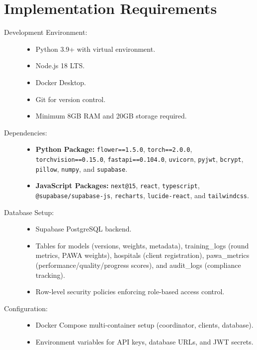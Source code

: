 \section{Implementation Requirements}

\begin{description}
    \item[Development Environment:] \hfill
    \begin{itemize}
        \item Python 3.9+ with virtual environment.
        \item Node.js 18 LTS.
        \item Docker Desktop.
        \item Git for version control.
        \item Minimum 8GB RAM and 20GB storage required.
    \end{itemize}
    \item[Dependencies:] \hfill
    \begin{itemize}
        \item \textbf{Python Package:} \texttt{flower==1.5.0}, \texttt{torch==2.0.0}, \texttt{torchvision==0.15.0}, \texttt{fastapi==0.104.0}, \texttt{uvicorn}, \texttt{pyjwt}, \texttt{bcrypt}, \texttt{pillow}, \texttt{numpy}, and \texttt{supabase}.
        \item \textbf{JavaScript Packages:} \texttt{next@15}, \texttt{react}, \texttt{typescript}, \texttt{@supabase/supabase-js}, \texttt{recharts}, \texttt{lucide-react}, and \texttt{tailwindcss}.
    \end{itemize}
    \item[Database Setup:] \hfill
    \begin{itemize}
        \item Supabase PostgreSQL backend.
        \item Tables for models (versions, weights, metadata), training\_logs (round metrics, PAWA weights), hospitals (client registration), pawa\_metrics (performance/quality/progress scores), and audit\_logs (compliance tracking).
        \item Row-level security policies enforcing role-based access control.
    \end{itemize}
    \item[Configuration:] \hfill
    \begin{itemize}
        \item Docker Compose multi-container setup (coordinator, clients, database).
        \item Environment variables for API keys, database URLs, and JWT secrets.

\end{itemize}
\end{description}
